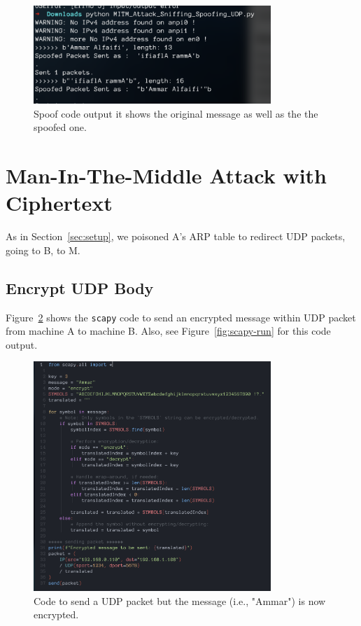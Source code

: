 \documentclass{article}
\def\c#1{\texttt{#1}}
\begin{document}
\begin{figure}[hb]
	\centering
	\includegraphics[width=0.8\textwidth]{figures/spoof.png}
	\caption{Spoof code output it shows the original message as well as the the spoofed one.}
	\label{fig:spoofed}
\end{figure}


\newpage
\section{Man-In-The-Middle Attack with Ciphertext} %
\label{sec:Man-In-The-Middle Attack with Ciphertext}
As in Section~\ref{sec:setup}, we poisoned A's ARP table to redirect UDP packets, going to B, to M.

\subsection{Encrypt UDP Body} %
\label{sub:Encrypt UDP Body}
Figure~\ref{fig:send-udp-enc} shows the \c{scapy} code to send an encrypted message within UDP packet
from machine A to machine B. Also, see Figure~\ref{fig:scapy-run} for this code output.

\begin{figure}[!hb]
	\centering
	\includegraphics[width=0.8\textwidth]{figures/udp-enc}
	\caption{Code to send a UDP packet but the message (i.e., "Ammar") is now encrypted.}
	\label{fig:send-udp-enc}
\end{figure}
\end{document}
